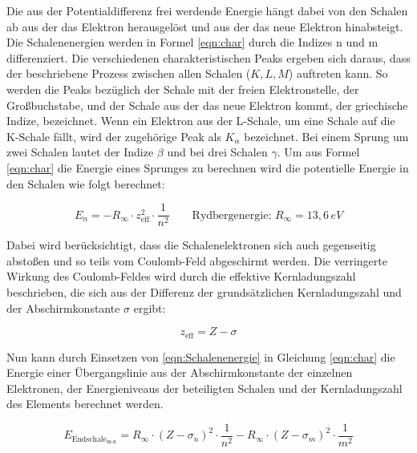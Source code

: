 \documentclass[titlepage = firstcover]{scrartcl}
\begin{document}
                \noindent
                Die aus der Potentialdifferenz frei werdende Energie hängt dabei von den Schalen ab aus der das Elektron herausgelöst und aus der das neue Elektron hinabsteigt. Die Schalenenergien 
                werden in Formel \ref{eqn:char} durch die Indizes n und m differenziert. Die verschiedenen charakteristischen Peaks ergeben sich daraus, dass der beschriebene Prozess zwischen
                allen Schalen ($K, L, M$) auftreten kann. So werden die Peaks bezüglich der Schale mit der freien Elektronstelle, der Großbuchstabe, und der Schale aus der das neue Elektron kommt,
                der griechische Indize, bezeichnet. Wenn ein Elektron aus der L-Schale, um eine Schale auf die K-Schale fällt, wird der zugehörige Peak als $K_{\alpha}$ bezeichnet. Bei einem Sprung
                um zwei Schalen lautet der Indize $\beta$ und bei drei Schalen $\gamma$. Um aus Formel \ref{eqn:char} die Energie eines Sprunges zu berechnen wird die potentielle Energie in den
                Schalen wie folgt berechnet:

                \begin{equation}
                  E_n = -R_{\infty} \cdot z_{\text{eff}}^2 \cdot \frac{1}{n^2} \qquad \text{Rydbergenergie}: \, R_{\infty}=13,6 \, eV
                  \label{eqn:Schalenenergie}
                \end{equation}
                
                \noindent
                Dabei wird berücksichtigt, dass die Schalenelektronen sich auch gegenseitig abstoßen und so teils vom Coulomb-Feld abgeschirmt werden. Die verringerte Wirkung des Coulomb-Feldes
                wird durch die effektive Kernladungszahl beschrieben, die sich aus der Differenz der grundsätzlichen Kernladungszahl und der Abschirmkonstante $\sigma$ ergibt:
                
                \begin{equation*}
                  z_{\text{eff}} = Z - \sigma
                \end{equation*}
                
                \noindent
                Nun kann durch Einsetzen von \ref{eqn:Schalenenergie} in Gleichung \ref{eqn:char} die Energie einer Übergangslinie aus der Abschirmkonstante der einzelnen Elektronen, der 
                Energieniveaus der beteiligten Schalen und der Kernladungszahl des Elements berechnet werden.
                
                \begin{equation}
                  E_{\text{Endschale}_{\text{m-n}}} = R_{\infty} \cdot (Z - \sigma_n)^2 \cdot \frac{1}{n^2} - R_{\infty} \cdot (Z - \sigma_m)^2 \cdot \frac{1}{m^2}
                  \label{eqn:Energiedifferenz} 
                \end{equation}
                
\end{document}
